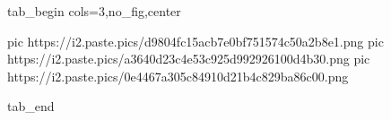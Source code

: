  
 
 
 
 


\ifcmt
  tab_begin cols=3,no_fig,center

     pic https://i2.paste.pics/d9804fc15acb7e0bf751574c50a2b8e1.png
		 pic https://i2.paste.pics/a3640d23c4e53c925d992926100d4b30.png
		 pic https://i2.paste.pics/0e4467a305c84910d21b4c829ba86c00.png

  tab_end
\fi
